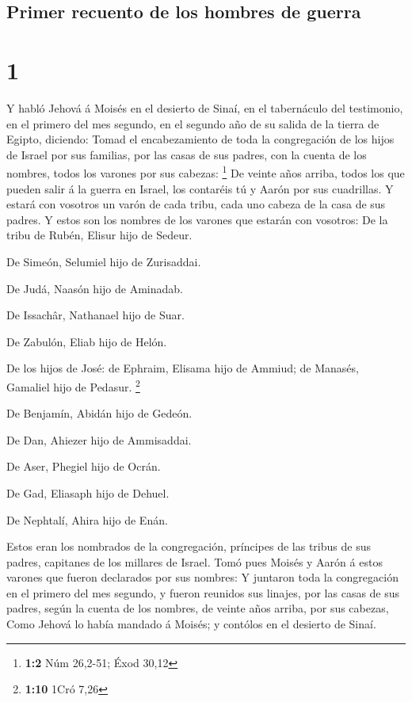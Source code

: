 \hypertarget{primer-recuento-de-los-hombres-de-guerra}{%
\subsection{Primer recuento de los hombres de
guerra}\label{primer-recuento-de-los-hombres-de-guerra}}

\hypertarget{section}{%
\section{1}\label{section}}

 Y habló Jehová á Moisés en el desierto de Sinaí, en el
tabernáculo del testimonio, en el primero del mes segundo, en el segundo
año de su salida de la tierra de Egipto, diciendo:  Tomad
el encabezamiento de toda la congregación de los hijos de Israel por sus
familias, por las casas de sus padres, con la cuenta de los nombres,
todos los varones por sus cabezas: \footnote{\textbf{1:2} Núm 26,2-51;
  Éxod 30,12}  De veinte años arriba, todos los que pueden
salir á la guerra en Israel, los contaréis tú y Aarón por sus
cuadrillas.  Y estará con vosotros un varón de cada tribu,
cada uno cabeza de la casa de sus padres.  Y estos son los
nombres de los varones que estarán con vosotros: De la tribu de Rubén,
Elisur hijo de Sedeur.

 De Simeón, Selumiel hijo de Zurisaddai.

 De Judá, Naasón hijo de Aminadab.

 De Issachâr, Nathanael hijo de Suar.

 De Zabulón, Eliab hijo de Helón.

 De los hijos de José: de Ephraim, Elisama hijo de
Ammiud; de Manasés, Gamaliel hijo de Pedasur. \footnote{\textbf{1:10}
  1Cró 7,26}

 De Benjamín, Abidán hijo de Gedeón.

 De Dan, Ahiezer hijo de Ammisaddai.

 De Aser, Phegiel hijo de Ocrán.

 De Gad, Eliasaph hijo de Dehuel.

 De Nephtalí, Ahira hijo de Enán.

 Estos eran los nombrados de la congregación, príncipes
de las tribus de sus padres, capitanes de los millares de Israel.
 Tomó pues Moisés y Aarón á estos varones que fueron
declarados por sus nombres:  Y juntaron toda la
congregación en el primero del mes segundo, y fueron reunidos sus
linajes, por las casas de sus padres, según la cuenta de los nombres, de
veinte años arriba, por sus cabezas,  Como Jehová lo
había mandado á Moisés; y contólos en el desierto de Sinaí.

